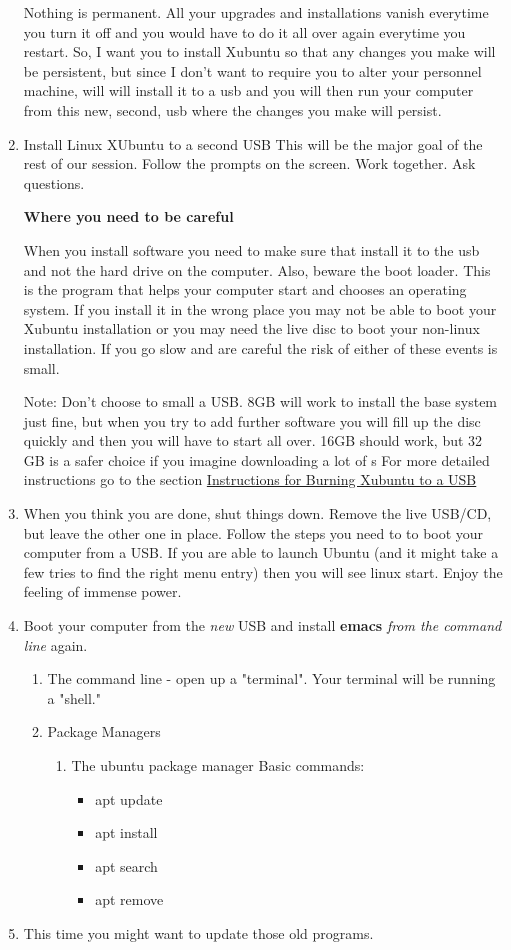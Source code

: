 \documentclass{article}
\begin{document}
\begin{enumerate}
Nothing is permanent. All your upgrades and installations vanish everytime you turn it off and you would have to do it all over again everytime you restart. So, I want you to install Xubuntu so that any changes you make will be persistent, but since I don't want to require you to alter your personnel machine, will will install it to a usb and you will then run your computer from this new, second, usb where the changes you make will persist.
\item Install Linux XUbuntu to a second USB
This will be the major goal of the rest of our session. Follow the prompts on the screen. Work together. Ask questions. 

\textbf{\textbf{Where you need to be careful}}

When you install software you need to make sure that install it to the usb and not the hard drive on the computer. Also, beware the boot loader. This is the program that helps your computer start and chooses an operating system. If you install it in the wrong place you may not be able to boot your Xubuntu installation or you may need the live disc to boot your non-linux installation. If you go slow and are careful the risk of either of these events is small. 

Note: Don't choose to small a USB. 8GB will work to install the base system just fine, but when you try to add further software you will fill up the disc quickly and then you will have to start all over. 16GB should work, but 32 GB is a safer choice if you imagine downloading a lot of s
For more detailed instructions go to the section \hyperref[sec:orgc5688be]{Instructions for Burning Xubuntu to a USB}
\item When you think you are done, shut things down. Remove the live USB/CD, but leave the other one in place. Follow the steps you need to to boot your computer from a USB. If you are able to launch Ubuntu (and it might take a few tries to find the right menu entry) then you will see linux start. Enjoy the feeling of immense power.
\item Boot your computer from the \emph{new} USB and install \textbf{emacs} \emph{from the command line} again.
\begin{enumerate}
\item The command line - open up a "terminal". Your terminal will be running a "shell."
\item Package Managers
\begin{enumerate}
\item The ubuntu package manager
Basic commands: 
\begin{itemize}
\item apt update
\item apt install
\item apt search
\item apt remove
\end{itemize}
\end{enumerate}
\end{enumerate}
\item This time you might want to update those old programs.
\end{enumerate}
\end{document}
